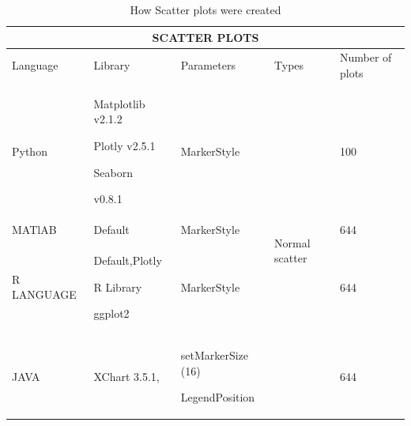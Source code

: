 \documentclass[12pt, a4paper,oneside]{report}
\begin{document}
\begin{table}[h]
	\centering {} \small
	
	\begin{tabular}{|p{3cm}|p{3cm}|p{3cm}|p{3cm}|p{3cm}|}
		
		\hline
		\multicolumn{5}{|c|}{SCATTER PLOTS} \\
		\hline
		
	Language & Library & Parameters &  Types & Number of plots\\ \hline
		
	Python  & Matplotlib v2.1.2 \par Plotly v2.5.1 \par Seaborn
		
		 v0.8.1 & MarkerStyle \par ['o', '*', '.', '+','x'] & \multirow{4}{*}{Normal scatter} &
		 
		  100\\ \hline	   
		  
	MATlAB   & Default &  MarkerStyle \par ['o', '*', '.', '+','x','s'] &   &  644 \\ \hline
		
	R LANGUAGE   & Default,Plotly \par R Library \par ggplot2 &  MarkerStyle \par ['o', '*', '.', '+','x','s'] &  &  644\\ \hline	
	
	JAVA   & XChart 3.5.1, & setMarkerSize (16) \par LegendPosition &   &  644\\ \hline
		  
	\end{tabular}
	
	\caption {How Scatter plots were created}	\label{Table:1}
\end{table}
\end{document}
